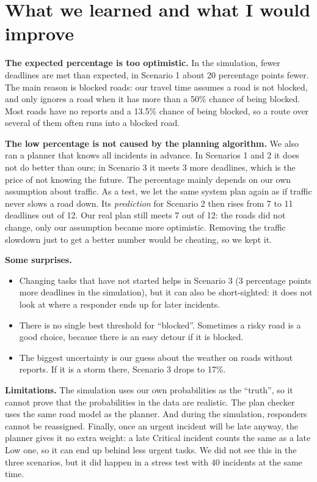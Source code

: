 \documentclass[11pt,a4paper]{article}
\begin{document}
\section{What we learned and what I would improve}

\textbf{The expected percentage is too optimistic.} In the simulation, fewer
deadlines are met than expected, in Scenario 1 about 20 percentage points fewer.
The main reason is blocked roads: our travel time assumes a road is not blocked,
and only ignores a road when it has more than a 50\% chance of being blocked. Most roads
have no reports and a 13.5\% chance of being blocked, so a route over several
of them often runs into a blocked road.

\textbf{The low percentage is not caused by the planning algorithm.} We also ran
a planner that knows all incidents in advance. In Scenarios 1 and 2 it does not
do better than ours; in Scenario 3 it meets 3 more deadlines, which is the price
of not knowing the future. The percentage mainly depends on our own assumption
about traffic. As a test, we let the same system plan again as if traffic never
slows a road down. Its \emph{prediction} for Scenario 2 then rises from 7 to 11
deadlines out of 12. Our real plan still meets 7 out of 12: the roads did not
change, only our assumption became more optimistic. Removing the traffic
slowdown just to get a better number would be cheating, so we kept it.

\textbf{Some surprises.}
\begin{itemize}
  \item Changing tasks that have not started helps in Scenario 3 (3 percentage
    points more deadlines in the simulation), but it can also be short-sighted:
    it does not look at where a responder ends up for later incidents.
  \item There is no single best threshold for ``blocked''. Sometimes a risky
    road is a good choice, because there is an easy detour if it is blocked.
  \item The biggest uncertainty is our guess about the weather on roads without
    reports. If it is a storm there, Scenario 3 drops to 17\%.
\end{itemize}

\textbf{Limitations.} The simulation uses our own probabilities as the ``truth'',
so it cannot prove that the probabilities in the data are realistic. The plan
checker uses the same road model as the planner. And during the simulation,
responders cannot be reassigned. Finally, once an urgent incident will be late
anyway, the planner gives it no extra weight: a late Critical incident counts
the same as a late Low one, so it can end up behind less urgent tasks. We did
not see this in the three scenarios, but it did happen in a stress test with
40 incidents at the same time.
\end{document}
